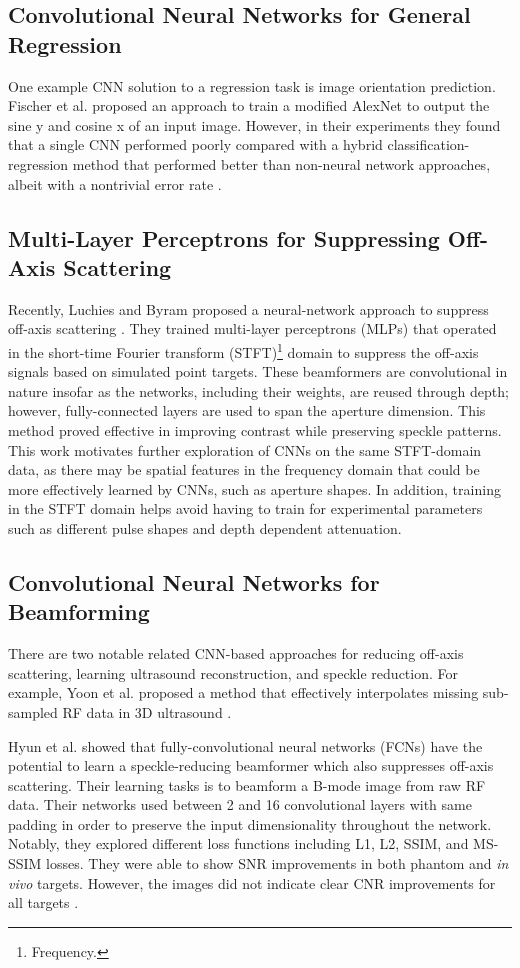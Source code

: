     \subsection{Convolutional Neural Networks for General Regression}
      One example CNN solution to a regression task is image orientation prediction. Fischer et al. proposed an approach to train a modified AlexNet to output the sine y and cosine x of an input image. However, in their experiments they found that a single CNN performed poorly compared with a hybrid classification-regression method that performed better than non-neural network approaches, albeit with a nontrivial error rate \cite{fischer2015image}.

    \subsection{Multi-Layer Perceptrons for Suppressing Off-Axis Scattering}
      Recently, Luchies and Byram proposed a neural-network approach to suppress off-axis scattering \cite{luchies_tmi_2018, training_improvements}. They trained multi-layer perceptrons (MLPs) that operated in the short-time Fourier transform (STFT)\footnote{Frequency.} domain to suppress the off-axis signals based on simulated point targets. These beamformers are convolutional in nature insofar as the networks, including their weights, are reused through depth; however, fully-connected layers are used to span the aperture dimension. This method proved effective in improving contrast while preserving speckle patterns. This work motivates further exploration of CNNs on the same STFT-domain data, as there may be spatial features in the frequency domain that could be more effectively learned by CNNs, such as aperture shapes. In addition, training in the STFT domain helps avoid having to train for experimental parameters such as different pulse shapes and depth dependent attenuation. %

    \subsection{Convolutional Neural Networks for Beamforming}
      There are two notable related CNN-based approaches for reducing off-axis scattering, learning ultrasound reconstruction, and speckle reduction. For example, Yoon et al. proposed a method that effectively interpolates missing sub-sampled RF data in 3D ultrasound \cite{yoon2018efficient}.

      Hyun et al. showed that fully-convolutional neural networks (FCNs) have the potential to learn a speckle-reducing beamformer which also suppresses off-axis scattering. Their learning tasks is to beamform a B-mode image from raw RF data. Their networks used between 2 and 16 convolutional layers with same padding in order to preserve the input dimensionality throughout the network. Notably, they explored different loss functions including L1, L2, SSIM, and MS-SSIM losses. They were able to show SNR improvements in both phantom and \textit{in vivo} targets. However, the images did not indicate clear CNR improvements for all targets \cite{hyun2019beamforming}.
